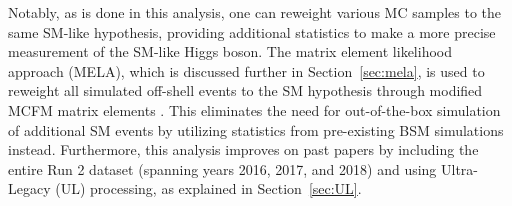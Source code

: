 Notably, as is done in this analysis, one can reweight various MC samples to the same SM-like hypothesis, providing additional statistics to make a more precise measurement of the SM-like Higgs boson. The matrix element likelihood approach (MELA), which is discussed further in Section~\ref{sec:mela}, is used to reweight all simulated off-shell events to the SM hypothesis through modified MCFM matrix elements \cite{12077235,10073492}. This eliminates the need for out-of-the-box simulation of additional SM events by utilizing statistics from pre-existing BSM simulations instead. Furthermore, this analysis improves on past papers \cite{190100174} by including the entire Run 2 dataset (spanning years 2016, 2017, and 2018) and using Ultra-Legacy (UL) processing, as explained in Section~\ref{sec:UL}. 

			
			
